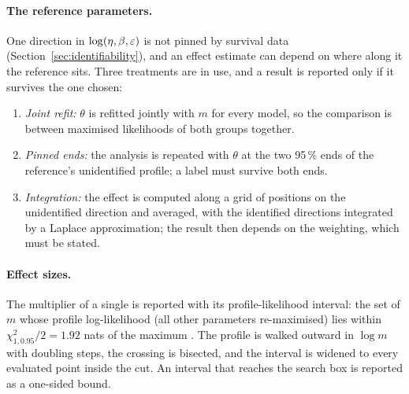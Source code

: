 \paragraph{The reference parameters.} One direction in $\log(\eta,\beta,\varepsilon)$ is not pinned by survival data
(Section~\ref{sec:identifiability}), and an effect estimate can depend on where along it the reference sits. Three
treatments are in use, and a result is reported only if it survives the one chosen:
\begin{enumerate}[leftmargin=1.5em,itemsep=1pt]
  \item \emph{Joint refit:} $\theta$ is refitted jointly with $m$ for every model, so the comparison is between
    maximised likelihoods of both groups together.
  \item \emph{Pinned ends:} the analysis is repeated with $\theta$ at the two 95\,\% ends of the reference's
    unidentified profile; a label must survive both ends.
  \item \emph{Integration:} the effect is computed along a grid of positions on the unidentified direction and
    averaged, with the identified directions integrated by a Laplace approximation; the result then depends on the
    weighting, which must be stated.
\end{enumerate}

\paragraph{Effect sizes.} The multiplier of a single is reported with its profile-likelihood interval: the set of
$m$ whose profile log-likelihood (all other parameters re-maximised) lies within $\chi^2_{1,0.95}/2=1.92$ nats of
the maximum \citep{venzon1988method}. The profile is walked outward in $\log m$ with doubling steps, the crossing is
bisected, and the interval is widened to every evaluated point inside the cut. An interval that reaches the search box
is reported as a one-sided bound.

